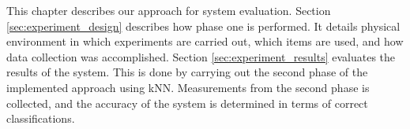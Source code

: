 This chapter describes our approach for system evaluation. 
Section \ref{sec:experiment_design} describes how phase one is performed.
It details physical environment in which experiments are carried out, which items are used, and how data collection was accomplished.
Section \ref{sec:experiment_results} evaluates the results of the system. 
This is done by carrying out the second phase of the implemented approach using kNN. 
Measurements from the second phase is collected, and the accuracy of the system is determined in terms of correct classifications. 